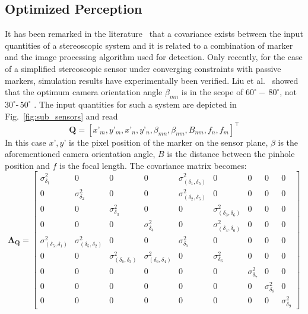\documentclass[5p,times,procedia]{elsarticle}
\begin{document}
\subsection{Optimized Perception}
It has been remarked in the literature~\cite{Di_Leo_2011} that a covariance exists between the input quantities of a stereoscopic system and it is related to a combination of marker and the image processing algorithm used for detection.
Only recently, for the case of a simplified stereoscopic sensor under converging constraints with passive markers, simulation results have experimentally been verified.
Liu et al.~\cite{Liu_2021} showed that the optimum camera orientation angle $\beta_{mn}$ is in the scope of $60^{\circ} -\, 80^{\circ}$, not $30^{\circ} \text{-}\, 50^{\circ}$ \cite{Yang2018,Fooladgar2013,Sankowski2017}. The input quantities for such a system are depicted in Fig.~\ref{fig:sub_sensors} and read
\begin{equation*}
	\mathbf{Q}= \left[x’_m, y’_m, x’_n, y’_n, \beta_{mn}, \beta_{nm}, B_{nm}, f_{n},f_{m}\right]^{\top}
\end{equation*}
In this case $x’, y’$ is the pixel position of the marker on the sensor plane, $\beta$ is the aforementioned camera orientation angle, $B$ is the distance between the pinhole position and $f$ is the focal length. The covariance matrix becomes:
\begin{equation}
	\label{eqn:CovarianceMatrix}
	\mathbf{\Lambda_{Q}} = 
	\begin{bmatrix}
		\sigma_{\delta_1}^2  & 0 & 0 & 0 & \sigma_{(\delta_1,\delta_5)}^2 & 0 & 0 & 0 & 0 \\
		0  & \sigma_{\delta_2}^2 & 0 & 0 & \sigma_{(\delta_2,\delta_5)}^2 & 0 & 0 & 0 & 0 \\
		0 & 0 & \sigma_{\delta_3}^2 & 0 & 0 & \sigma_{(\delta_3,\delta_6)}^2 & 0 & 0 & 0 \\
		0 & 0 & 0 & \sigma_{\delta_4}^2 & 0 & \sigma_{(\delta_4,\delta_6)}^2 & 0 & 0 & 0 \\
		\sigma_{(\delta_5,\delta_1)}^2 & \sigma_{(\delta_5,\delta_2)}^2 & 0 & 0 & \sigma_{\delta_5}^2 & 0 & 0 & 0 & 0 \\
		0 & 0 & \sigma_{(\delta_6,\delta_3)}^2 & \sigma_{(\delta_6,\delta_4)}^2 & 0 & \sigma_{\delta_6}^2 & 0 & 0 & 0 \\
		0 & 0 & 0 & 0 & 0 & 0 & \sigma_{\delta_7}^2 & 0 & 0 \\
		0 & 0 & 0 & 0 & 0 & 0 & 0 & \sigma_{\delta_8}^2 & 0 \\
		0 & 0 & 0 & 0 & 0 & 0 & 0 & 0 & \sigma_{\delta_9}^2
	\end{bmatrix}
\end{equation}
\end{document}
